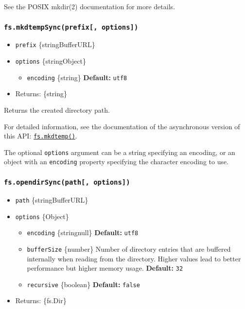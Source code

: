 See the POSIX mkdir(2) documentation for more details.

\subsubsection{\texorpdfstring{\texttt{fs.mkdtempSync(prefix{[},\ options{]})}}{fs.mkdtempSync(prefix{[}, options{]})}}\label{fs.mkdtempsyncprefix-options}

\begin{itemize}
\tightlist
\item
  \texttt{prefix} \{string\textbar Buffer\textbar URL\}
\item
  \texttt{options} \{string\textbar Object\}

  \begin{itemize}
  \tightlist
  \item
    \texttt{encoding} \{string\} \textbf{Default:}
    \texttt{\textquotesingle{}utf8\textquotesingle{}}
  \end{itemize}
\item
  Returns: \{string\}
\end{itemize}

Returns the created directory path.

For detailed information, see the documentation of the asynchronous
version of this API:
\hyperref[fsmkdtempprefix-options-callback]{\texttt{fs.mkdtemp()}}.

The optional \texttt{options} argument can be a string specifying an
encoding, or an object with an \texttt{encoding} property specifying the
character encoding to use.

\subsubsection{\texorpdfstring{\texttt{fs.opendirSync(path{[},\ options{]})}}{fs.opendirSync(path{[}, options{]})}}\label{fs.opendirsyncpath-options}

\begin{itemize}
\tightlist
\item
  \texttt{path} \{string\textbar Buffer\textbar URL\}
\item
  \texttt{options} \{Object\}

  \begin{itemize}
  \tightlist
  \item
    \texttt{encoding} \{string\textbar null\} \textbf{Default:}
    \texttt{\textquotesingle{}utf8\textquotesingle{}}
  \item
    \texttt{bufferSize} \{number\} Number of directory entries that are
    buffered internally when reading from the directory. Higher values
    lead to better performance but higher memory usage.
    \textbf{Default:} \texttt{32}
  \item
    \texttt{recursive} \{boolean\} \textbf{Default:} \texttt{false}
  \end{itemize}
\item
  Returns: \{fs.Dir\}
\end{itemize}

